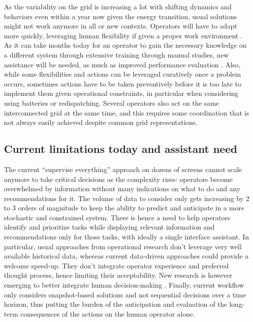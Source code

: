 \documentclass{IOS-Book-Article}
\begin{document}
As the variability on the grid is increasing a lot with shifting dynamics and behaviors even within a year now given the energy transition, usual solutions might not work anymore in all or new contexts. Operators will have to adapt more quickly, leveraging human flexibility if given a proper work environment \cite{abram2021flexibility}. As it can take months today for an operator to gain the necessary knowledge on a different system through extensive training through manual studies, new assistance will be needed, as much as improved performance evaluation \cite{teive2022intelligent}. Also, while some flexibilities and actions can be leveraged curatively once a problem occurs, sometimes actions have to be taken preventively before it is too late to implement them given operational constraints, in particular when considering using batteries or redispatching.
Several operators also act on the same interconnected grid at the same time, and this requires some coordination that is not always easily achieved despite common grid representations.

\subsection{Current limitations today and assistant need}
The current ``supervise everything'' approach on dozens of screens cannot scale anymore to take critical decisions as the complexity rises: operators become overwhelmed by information without many indications on what to do and any recommendations for it. The volume of data to consider only gets increasing by 2 to 3 orders of magnitude to keep the ability to predict and anticipate in a more stochastic and constrained system. There is hence a need to help operators identify and prioritize tasks while displaying relevant information and recommendations only for those tasks, with ideally a single interface assistant. In particular, usual approaches from operational research \cite{bhaskar2011security,heidarifar2021optimal} don’t leverage very well available historical data, whereas current data-driven approaches could provide a welcome speed-up. They don’t integrate operator experience and preferred thought process, hence limiting their acceptability. New research is however emerging to better integrate human decision-making \cite{mohrlen2022humans}.
Finally, current workflow only considers snapshot-based solutions and not sequential decisions over a time horizon, thus putting the burden of the anticipation and evaluation of the long-term consequences of the actions on the human operator alone. 
\end{document}
